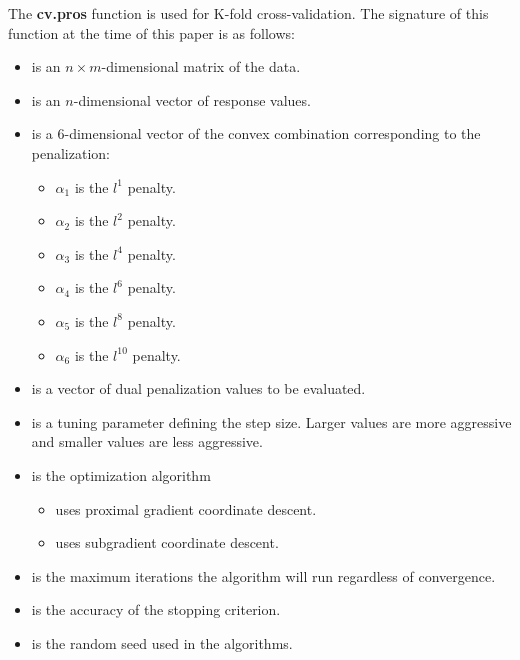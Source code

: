 \documentclass[article]{jss}
\numberwithin{equation}{section}
\begin{document}
The \textbf{cv.pros} function is used for K-fold cross-validation.
The signature of this function at the time of this paper is as follows:

\begin{itemize}
\item {} is an $n \times m$-dimensional matrix of the data.

\item {} is an $n$-dimensional vector of response values.

\item {} is a $6$-dimensional vector of the convex combination corresponding to the penalization:
 \begin{itemize}
   \item $\alpha_1$ is the $l^1$ penalty.
   \item $\alpha_2$ is the $l^2$ penalty.
   \item $\alpha_3$ is the $l^4$ penalty.
   \item $\alpha_4$ is the $l^6$ penalty.
   \item $\alpha_5$ is the $l^8$ penalty.
   \item $\alpha_6$ is the $l^{10}$ penalty.
\end{itemize}

\item {} is a vector of dual penalization values to be evaluated.

\item {} is a tuning parameter defining the step size. Larger values are more aggressive and smaller values are less aggressive.

\item {} is the optimization algorithm
\begin{itemize}
\item {} uses proximal gradient coordinate descent.
\item {} uses subgradient coordinate descent.
\end{itemize}

\item {} is the maximum iterations the algorithm will run regardless of convergence.

\item {} is the accuracy of the stopping criterion.

\item {} is the random seed used in the algorithms.

\end{itemize}
\end{document}
